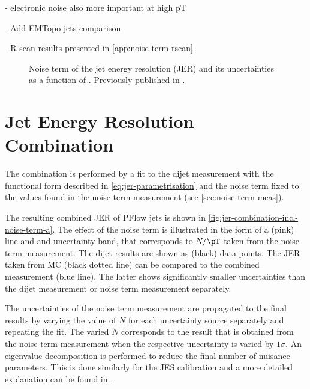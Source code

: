 - electronic noise also more important at high pT

- Add EMTopo jets comparison

- R-scan results presented in \cref{app:noise-term-rscan}.







\begin{figure}
    \caption{Noise term of the jet energy resolution (JER) and its uncertainties as a function of \abseta. Previously published in .}
    \label{fig:noise-term-results-pflow}
\end{figure}



\section{Jet Energy Resolution Combination}

The combination is performed by a fit to the dijet measurement with the functional form described in \cref{eq:jer-parametrisation} and the noise term fixed to the values found in the noise term measurement (see \cref{sec:noise-term-meas}).

The resulting combined JER of PFlow jets is shown in \cref{fig:jer-combination-incl-noise-term-a}. The effect of the noise term is illustrated in the form of a (pink) line and and uncertainty band, that corresponds to $N / \pT$ taken from the noise term measurement. The dijet results are shown as (black) data points.
The JER taken from MC (black dotted line) can be compared to the combined \insitu measurement (blue line). The latter shows significantly smaller uncertainties than the dijet measurement or noise term measurement separately. 

The uncertainties of the noise term measurement are propagated to the final results by varying the value of $N$ for each uncertainty source separately and repeating the fit. The varied $N$ corresponds to the result that is obtained from the noise term measurement when the respective uncertainty is varied by $1\sigma$.
An eigenvalue decomposition is performed to reduce the final number of nuisance parameters. This is done similarly for the JES calibration and a more detailed explanation can be found in .


